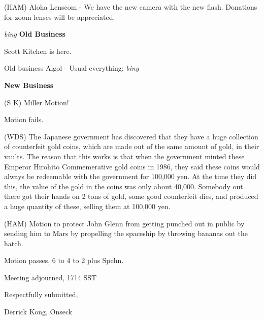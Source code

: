 (HAM) Aloha Lenscom - We have the new camera with the new flash.
Donations for zoom lenses will be appreciated.

\vspace{0.15in}
{\em bing\/} {\bf Old Business}

Scott Kitchen is here.

Old business Algol - Usual everything: {\em bing\/}

\vspace{0.15in}
{\bf New Business}

(S K) Miller Motion!

Motion fails.

(WDS) The Japanese government has discovered that they have a huge
collection of counterfeit gold coins, which are made out of the same
amount of gold, in their vaults.  The reason that this works is that
when the government minted these Emperor Hirohito Commemerative gold
coins in 1986, they said these coins would always be redeemable with
the government for 100,000 yen.  At the time they did this, the value
of the gold in the coins was only about 40,000.  Somebody out there
got their hands on 2 tons of gold, some good counterfeit dies, and
produced a huge quantity of these, selling them at 100,000 yen.

(HAM) Motion to protect John Glenn from getting punched out in public
by sending him to Mars by propelling the spaceship by throwing bananas
out the hatch.

Motion passes, 6 to 4 to 2 plus Spehn.

Meeting adjourned, 1714 SST 

\vspace{0.15in}
\begin{center}
Respectfully submitted,

Derrick Kong, Onseck
\end{center}

